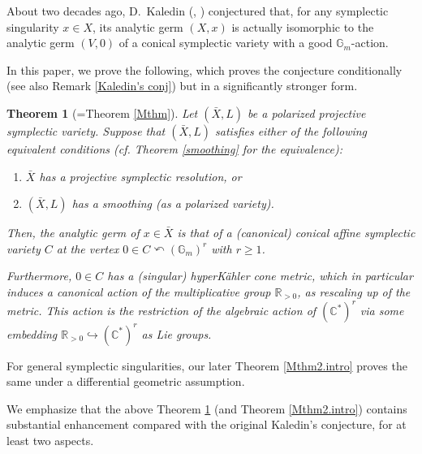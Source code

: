 \documentclass[12pt,a4paper]{amsart}
\newtheorem{Thm}{Theorem}[section]
\theoremstyle{remark}
\theoremstyle{definition}
\def\R{\mathbb{R}}
\def\C{\mathbb{C}}
\begin{document}
\vspace{2mm}
About two decades ago, 
D.~Kaledin (\cite[cf., Remark 4.2, \S 4]{Kaledin}, \cite[Conjecture 1.8]{Kaledin 2})  conjectured  that, for any symplectic singularity $x \in X$, its analytic germ 
$(X, x)$ is actually isomorphic to 
the analytic germ  $(V,0)$ of a 
conical symplectic variety with 
a good $\mathbb{G}_m$-action. 

In this paper, we prove the following, 
which proves the conjecture  conditionally (see also Remark \ref{Kaledin's conj}) but in a significantly stronger form. 

\begin{Thm}[=Theorem \ref{Mthm}]\label{Mthm.intro}
Let $(\bar{X},L)$ be a polarized projective symplectic variety.  Suppose that $(\bar{X},L)$
satisfies either of the following equivalent conditions  (cf. Theorem \ref{smoothing} for the equivalence): 
\begin{enumerate}
\item \label{1.1i} $\bar{X}$ has a projective 
symplectic resolution, or 
\item \label{1.1ii} $(\bar{X},L)$ has a smoothing (as a polarized variety). 
\end{enumerate}

Then, the analytic germ of $x\in \bar{X}$ is that of a (canonical) 
conical affine symplectic variety $C$ at the vertex $0\in C\curvearrowleft (\mathbb{G}_m)^r$ with $r\ge 1$. 

Furthermore, $0\in C$ has a (singular) hyperK\"ahler cone  metric, %
which in particular induces a canonical action 
of 
the multiplicative group $\R_{>0}$, 
as rescaling up of the metric. This action is the restriction of  
the algebraic action of $(\C^*)^r$ 
via some embedding $\R_{>0}\hookrightarrow (\C^*)^r$ 
as Lie groups. 
\end{Thm}
For general symplectic singularities, our later 
Theorem \ref{Mthm2.intro} proves the same under 
a differential geometric assumption. 

\vspace{3mm}

We emphasize that the above Theorem \ref{Mthm.intro} (and 
Theorem \ref{Mthm2.intro}) contains 
substantial enhancement compared with 
the original Kaledin's conjecture, for at least two 
aspects. 
\end{document}
